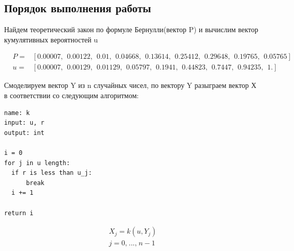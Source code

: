 \documentclass[a4paper, 14pt]{extarticle}
\begin{document}
\subsection*{Порядок выполнения работы}

Найдем теоретический закон по формуле Бернулли(вектор P) и вычислим вектор
кумулятивных вероятностей u

\vspace{-10pt}

\begin{align*}
  & P =& \left[ 0.00007,\hspace{5pt} 0.00122,\hspace{5pt} 0.01   ,\hspace{5pt} 0.04668,\hspace{5pt} 0.13614,\hspace{5pt} 0.25412,\hspace{5pt} 0.29648,\hspace{5pt} 0.19765,\hspace{5pt} 0.05765\right] \\
  & u =& \left[0.00007,\hspace{5pt} 0.00129,\hspace{5pt} 0.01129,\hspace{5pt} 0.05797,\hspace{5pt} 0.1941 ,\hspace{5pt} 0.44823,\hspace{5pt} 0.7447 ,\hspace{5pt} 0.94235,\hspace{5pt} 1.     \right]
\end{align*}

Смоделируем вектор Y из n случайных чисел, 
по вектору Y разыграем вектор Х в соответствии со следующим алгоритмом:

\begin{center}
  \begin{minipage}{0.43\textwidth}
    \begin{tcolorbox}[colback=white!10, colframe=black, width=\textwidth]
      \begin{verbatim}
name: k
input: u, r
output: int

i = 0
for j in u length:
  if r is less than u_j:
      break
  i += 1

return i
      \end{verbatim}
    \end{tcolorbox}
  \end{minipage}
  \hspace*{0pt}
  \begin{minipage}{0.43\textwidth}
    \begin{gather*}
      X_j = k(u, Y_j) \\
      j = 0, \hspace{1pt} ..., \hspace{1pt} n - 1 
    \end{gather*}
  \end{minipage}
\end{center}
\end{document}
